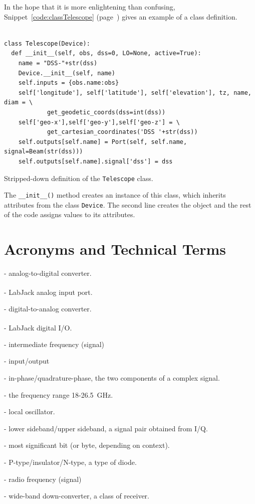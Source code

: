\documentclass[letterpaper,11pt]{book}
\begin{document}
In the hope that it is more enlightening than confusing, 
Snippet~\ref{code:classTelescope} (page~\pageref{code:classTelescope}) gives an
example of a class definition.
\begin{code}[h!tb]
\begin{center}
\begin{verbatim}
  
class Telescope(Device):
  def __init__(self, obs, dss=0, LO=None, active=True):
    name = "DSS-"+str(dss)
    Device.__init__(self, name)
    self.inputs = {obs.name:obs}
    self['longitude'], self['latitude'], self['elevation'], tz, name, diam = \
            get_geodetic_coords(dss=int(dss))
    self['geo-x'],self['geo-y'],self['geo-z'] = \
            get_cartesian_coordinates('DSS '+str(dss))
    self.outputs[self.name] = Port(self, self.name, signal=Beam(str(dss)))
    self.outputs[self.name].signal['dss'] = dss\end{verbatim}
\caption{\label{code:classTelescope}Stripped-down definition of the 
{\tt Telescope} class.}
\end{center}
\end{code}
The {\tt \_\_init\_\_()} method creates an instance of this class, which 
inherits attributes from the class {\tt Device}. The second line creates the 
object and the rest of the code assigns values to its attributes.

\tableofcontents
\listoffigures
{}

\chapter*{Acronyms and Technical Terms}

\begin{description}\itemsep0pt \parskip0pt 
  \item[ADC]- analog-to-digital converter.
  \item[AIN]- LabJack\textsuperscript{\textregistered} analog input port.
  \item[DAC]- digital-to-analog converter.
  \item[DIO]- LabJack\textsuperscript{\textregistered} digital I/O.
  \item[IF]- intermediate frequency (signal) 
  \item[I/O]- input/output
  \item[I/Q]- in-phase/quadrature-phase, the two components of a complex signal.
  \item[K-band]- the frequency range 18-26.5~GHz.
  \item[LO]- local oscillator.
  \item[L/U]- lower sideband/upper sideband, a signal pair obtained from I/Q.
  \item[MSB]- most significant bit (or byte, depending on context).
  \item[PIN]- P-type/insulator/N-type, a type of diode.
  \item[RF]- radio frequency (signal)
  \item[WBDC]- wide-band down-converter, a class of receiver.
\end{description}
\end{document}
